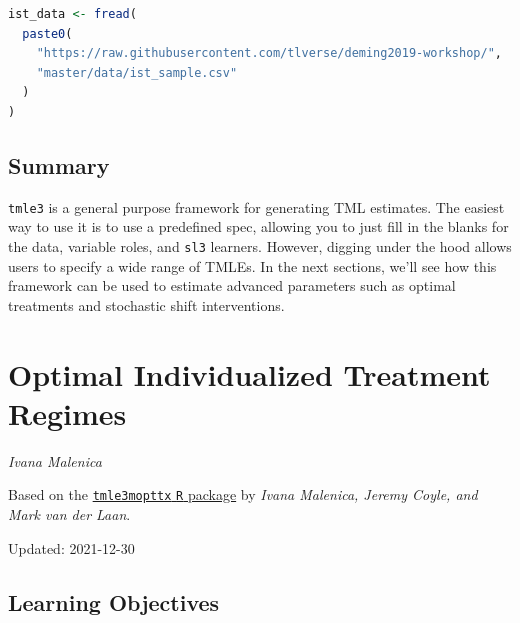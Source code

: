 \documentclass[
  12pt, krantz2,
]{krantz}
\newcommand{\passthrough}[1]{#1}
\newcommand{\1}{\mathbbm{1}}
\theoremstyle{definition}
\theoremstyle{definition}
\theoremstyle{definition}
\theoremstyle{definition}
\theoremstyle{remark}
\begin{document}
\begin{lstlisting}[language=R]
ist_data <- fread(
  paste0(
    "https://raw.githubusercontent.com/tlverse/deming2019-workshop/",
    "master/data/ist_sample.csv"
  )
)
\end{lstlisting}

\hypertarget{summary}{%
\section{Summary}\label{summary}}

\passthrough{\lstinline!tmle3!} is a general purpose framework for generating TML estimates. The easiest
way to use it is to use a predefined spec, allowing you to just fill in the
blanks for the data, variable roles, and \passthrough{\lstinline!sl3!} learners. However, digging under
the hood allows users to specify a wide range of TMLEs. In the next sections,
we'll see how this framework can be used to estimate advanced parameters such as
optimal treatments and stochastic shift interventions.

\hypertarget{optimal-individualized-treatment-regimes}{%
\chapter{Optimal Individualized Treatment Regimes}\label{optimal-individualized-treatment-regimes}}

\emph{Ivana Malenica}

Based on the \href{https://github.com/tlverse/tmle3mopttx}{\passthrough{\lstinline!tmle3mopttx!} \passthrough{\lstinline!R!} package}
by \emph{Ivana Malenica, Jeremy Coyle, and Mark van der Laan}.

Updated: 2021-12-30

\hypertarget{learning-objectives-1}{%
\section{Learning Objectives}\label{learning-objectives-1}}
\end{document}
